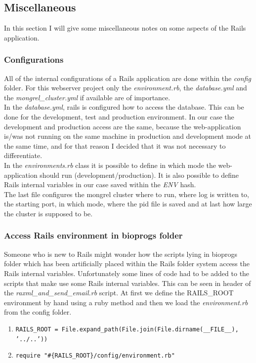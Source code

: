 \documentclass{scrartcl}
\begin{document}
		\subsection{Miscellaneous}
		In this section I will give some miscellaneous notes on some aspects of the Rails application.
		
		\subsubsection{Configurations}
			All of the internal configurations of a Rails application are done within the \textit{config} folder. For this webserver project only the \textit{environment.rb}, the \textit{database.yml} and the \textit{mongrel\_cluster.yml} if available are of importance. \\
			In the \textit{database.yml}, rails is configured how to access the database. This can be done for the development, test and production environment. In our case the development and production access are the same, because the web-application is/was not running on the same machine in production and development mode at the same time, and for that reason I decided that it was not necessary to differentiate.  \\
			In the \textit{environments.rb} class it is possible to define in which mode the web-application should run (development/production). It is also possible to define Rails internal variables in our case saved within the \textit{ENV} hash. \\ 
			The last file configures the mongrel cluster where to run, where log is written to, the starting port, in which mode, where the pid file is saved and at last how large the cluster is supposed to be.  
			
		\subsubsection{Access Rails environment in bioprogs folder} 
			Someone who is new to Rails might wonder how the scripts lying in bioprogs folder which has been artificially placed within the Rails folder system access the Rails internal variables. Unfortunately some lines of code had to be added to the scripts that make use some Rails internal variables. This can be seen in header of the  \textit{raxml\_and\_send\_email.rb} script. At first we define the RAILS\_ROOT environment by hand using a ruby method and then we load the \textit{environment.rb} from the config folder.   
			\begin{enumerate}
			\item \texttt{RAILS\_ROOT = File.expand\_path(File.join(File.dirname(\_\_FILE\_\_), '../..'))}\\
			\item \texttt{require "\#\{RAILS\_ROOT\}/config/environment.rb"}\\
			\end{enumerate}
\end{document}
